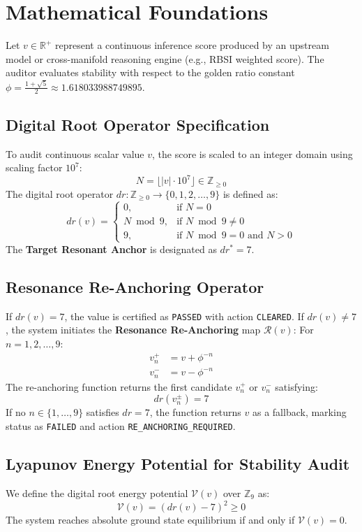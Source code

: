 \section{Mathematical Foundations}
Let $v \in \mathbb{R}^+$ represent a continuous inference score produced by an upstream model or cross-manifold reasoning engine (e.g., RBSI weighted score). The auditor evaluates stability with respect to the golden ratio constant $\phi = \frac{1+\sqrt{5}}{2} \approx 1.618033988749895$.

\subsection{Digital Root Operator Specification}
To audit continuous scalar value $v$, the score is scaled to an integer domain using scaling factor $10^7$:
\begin{equation}
    N = \lfloor |v| \cdot 10^7 \rfloor \in \mathbb{Z}_{\ge 0}
\end{equation}
The digital root operator $dr: \mathbb{Z}_{\ge 0} \to \{0, 1, 2, \dots, 9\}$ is defined as:
\begin{equation}
    dr(v) = \begin{cases}
        0, & \text{if } N = 0 \\
        N \bmod 9, & \text{if } N \bmod 9 \neq 0 \\
        9, & \text{if } N \bmod 9 = 0 \text{ and } N > 0
    \end{cases}
\end{equation}
The \textbf{Target Resonant Anchor} is designated as $dr^* = 7$.

\subsection{Resonance Re-Anchoring Operator}
If $dr(v) = 7$, the value is certified as \texttt{PASSED} with action \texttt{CLEARED}.
If $dr(v) \neq 7$, the system initiates the \textbf{Resonance Re-Anchoring} map $\mathcal{R}(v)$:
For $n = 1, 2, \dots, 9$:
\begin{align}
    v_n^+ &= v + \phi^{-n} \\
    v_n^- &= v - \phi^{-n}
\end{align}
The re-anchoring function returns the first candidate $v_n^+$ or $v_n^-$ satisfying:
\begin{equation}
    dr(v_n^\pm) = 7
\end{equation}
If no $n \in \{1, \dots, 9\}$ satisfies $dr = 7$, the function returns $v$ as a fallback, marking status as \texttt{FAILED} and action \texttt{RE\_ANCHORING\_REQUIRED}.

\subsection{Lyapunov Energy Potential for Stability Audit}
We define the digital root energy potential $\mathcal{V}(v)$ over $\mathbb{Z}_9$ as:
\begin{equation}
    \mathcal{V}(v) = (dr(v) - 7)^2 \ge 0
\end{equation}
The system reaches absolute ground state equilibrium if and only if $\mathcal{V}(v) = 0$.

